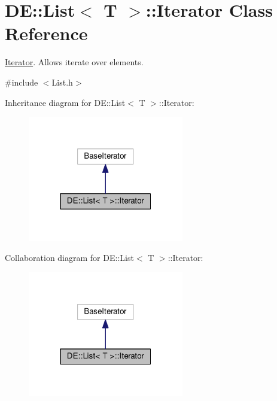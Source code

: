 \hypertarget{classDE_1_1List_1_1Iterator}{}\section{DE\+:\+:List$<$ T $>$\+:\+:Iterator Class Reference}
\label{classDE_1_1List_1_1Iterator}


\hyperlink{classDE_1_1List_1_1Iterator}{Iterator}. Allows iterate over elements.  




{\ttfamily \#include $<$List.\+h$>$}



Inheritance diagram for DE\+:\+:List$<$ T $>$\+:\+:Iterator\+:
\nopagebreak
\begin{figure}[H]
\begin{center}
\leavevmode
\includegraphics[width=193pt]{classDE_1_1List_1_1Iterator__inherit__graph}
\end{center}
\end{figure}


Collaboration diagram for DE\+:\+:List$<$ T $>$\+:\+:Iterator\+:
\nopagebreak
\begin{figure}[H]
\begin{center}
\leavevmode
\includegraphics[width=193pt]{classDE_1_1List_1_1Iterator__coll__graph}
\end{center}
\end{figure}
